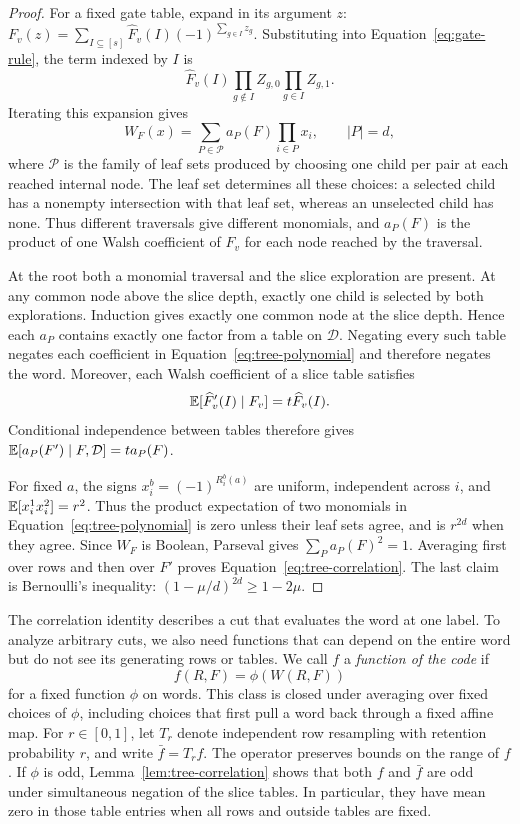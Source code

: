 \begin{proof}
For a fixed gate table, expand in its argument $z$:
$F_v(z)=\sum_{I\subseteq[s]}\widehat F_v(I)(-1)^{\sum_{g\in I}z_g}$.
Substituting into Equation~\eqref{eq:gate-rule}, the term indexed
by $I$ is
\[
 \widehat F_v(I)
 \prod_{g\notin I}Z_{g,0}\prod_{g\in I}Z_{g,1}.
\]
Iterating this expansion gives
\begin{equation}
 W_F(x)=\sum_{P\in\mathscr P}a_P(F)\prod_{i\in P}x_i,
 \qquad |P|=d,
 \label{eq:tree-polynomial}
\end{equation}
where $\mathscr P$ is the family of leaf sets produced by choosing
one child per pair at each reached internal node.  The leaf set
determines all these choices: a selected child has a nonempty
intersection with that leaf set, whereas an unselected child has
none.  Thus different traversals give different monomials, and
$a_P(F)$ is the product of one Walsh coefficient of $F_v$ for each
node reached by the traversal.

At the root both a monomial traversal and the slice exploration
are present.  At any common node above the slice depth, exactly
one child is selected by both explorations.  Induction gives
exactly one common node at the slice depth.  Hence each $a_P$
contains exactly one factor from a table on $\mathcal D$.
Negating every such table negates each coefficient in
Equation~\eqref{eq:tree-polynomial} and therefore negates the word.
Moreover, each Walsh coefficient of a slice table satisfies
\[
 \mathbb E[\widehat F'_v(I)\mid F_v]=t\widehat F_v(I).
\]
Conditional independence between tables therefore gives
$\mathbb E[a_P(F')\mid F,\mathcal D]=t a_P(F)$.

For fixed $a$, the signs
$x_i^b=(-1)^{R_i^b(a)}$ are uniform, independent across $i$, and
$\mathbb E[x_i^1x_i^2]=r^2$.  Thus the product expectation of two
monomials in Equation~\eqref{eq:tree-polynomial} is zero unless
their leaf sets agree, and is $r^{2d}$ when they agree.
Since $W_F$ is Boolean, Parseval gives $\sum_P a_P(F)^2=1$.
Averaging first over rows and then over $F'$ proves
Equation~\eqref{eq:tree-correlation}.  The last claim is
Bernoulli's inequality:
$(1-\mu/d)^{2d}\ge1-2\mu$.
\end{proof}

The correlation identity describes a cut that evaluates the word at
one label. To analyze arbitrary cuts, we also need functions that can
depend on the entire word but do not see its generating rows or tables.
We call $f$ a \emph{function of the code} if
\begin{equation}
 f(R,F)=\phi(W(R,F))
 \label{eq:function-of-code}
\end{equation}
for a fixed function $\phi$ on words.  This class is closed under
averaging over fixed choices of $\phi$, including choices that
first pull a word back through a fixed affine map.
For $r\in[0,1]$, let $T_r$ denote independent row resampling with
retention probability $r$, and write $\bar f=T_rf$.
The operator preserves bounds on the range of $f$.
If $\phi$ is odd, Lemma~\ref{lem:tree-correlation} shows that both
$f$ and $\bar f$ are odd under simultaneous negation of the slice
tables.  In particular, they have mean zero in those table entries
when all rows and outside tables are fixed.

